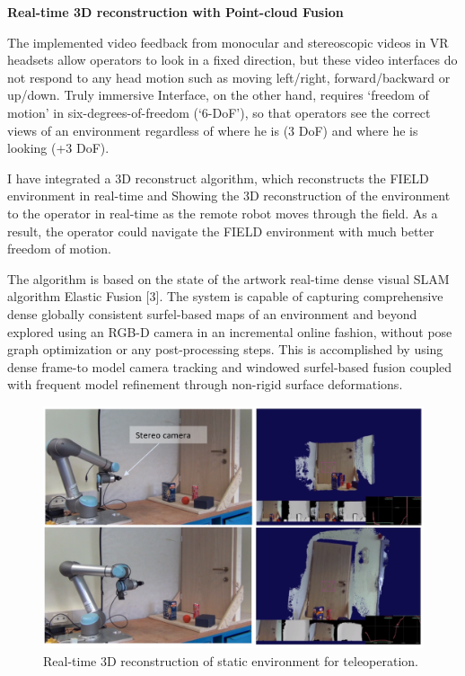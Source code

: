 \textbf{Real-time 3D reconstruction with Point-cloud Fusion}

The implemented video feedback from monocular and stereoscopic videos in VR headsets allow operators to look in a fixed direction, but these video interfaces do not respond to any head motion such as moving left/right, forward/backward or up/down. Truly immersive Interface, on the other hand, requires ‘freedom of motion’ in six-degrees-of-freedom (‘6-DoF’), so that operators see the correct views of an environment regardless of where he is (3 DoF) and where he is looking (+3 DoF).

I have integrated a 3D reconstruct algorithm, which reconstructs the FIELD environment in real-time and Showing the 3D reconstruction of the environment to the operator in real-time as the remote robot moves through the field. As a result, the operator could navigate the FIELD environment with much better freedom of motion.


The algorithm is based on the state of the artwork real-time dense visual SLAM algorithm Elastic Fusion [3]. The system is capable of capturing comprehensive dense globally consistent surfel-based maps of an environment and beyond explored using an RGB-D camera in an incremental online fashion, without pose graph optimization or any post-processing steps. This is accomplished by using dense frame-to model camera tracking and windowed surfel-based fusion coupled with frequent model refinement through non-rigid surface deformations.

\begin{figure}[h]
    \centering
    \includegraphics[scale=0.5]{images/Elastic_Fusion.PNG}
    \caption{Real-time 3D reconstruction of static environment for teleoperation.}
    \label{fig:Elastic}
\end{figure}\\


